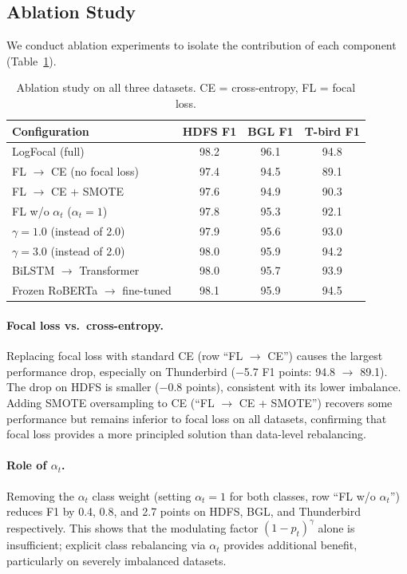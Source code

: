 \documentclass[conference]{IEEEtran}
\begin{document}
\subsection{Ablation Study}\label{sec:ablation}

We conduct ablation experiments to isolate the contribution of each component (Table~\ref{tab:ablation}).

\begin{table}[t]
\centering
\caption{Ablation study on all three datasets. CE = cross-entropy, FL = focal loss.}
\label{tab:ablation}
\small
\setlength{\tabcolsep}{4pt}
\begin{tabular}{lccc}
\toprule
\textbf{Configuration} & \textbf{HDFS F1} & \textbf{BGL F1} & \textbf{T-bird F1} \\
\midrule
LogFocal (full) & 98.2 & 96.1 & 94.8 \\
\midrule
FL $\to$ CE (no focal loss) & 97.4 & 94.5 & 89.1 \\
FL $\to$ CE + SMOTE & 97.6 & 94.9 & 90.3 \\
FL w/o $\alpha_t$ ($\alpha_t = 1$) & 97.8 & 95.3 & 92.1 \\
$\gamma = 1.0$ (instead of 2.0) & 97.9 & 95.6 & 93.0 \\
$\gamma = 3.0$ (instead of 2.0) & 98.0 & 95.9 & 94.2 \\
BiLSTM $\to$ Transformer & 98.0 & 95.7 & 93.9 \\
Frozen RoBERTa $\to$ fine-tuned & 98.1 & 95.9 & 94.5 \\
\bottomrule
\end{tabular}
\end{table}

\paragraph{Focal loss vs.\ cross-entropy.}
Replacing focal loss with standard CE (row ``FL $\to$ CE'')
causes the largest performance drop,
especially on Thunderbird ($-$5.7 F1 points: 94.8 $\to$ 89.1).
The drop on HDFS is smaller ($-$0.8 points), consistent with its lower imbalance.
Adding SMOTE oversampling to CE (``FL $\to$ CE + SMOTE'') recovers some performance
but remains inferior to focal loss on all datasets,
confirming that focal loss provides a more principled solution than data-level rebalancing.

\paragraph{Role of $\alpha_t$.}
Removing the $\alpha_t$ class weight (setting $\alpha_t = 1$ for both classes, row ``FL w/o $\alpha_t$'')
reduces F1 by 0.4, 0.8, and 2.7 points on HDFS, BGL, and Thunderbird respectively.
This shows that the modulating factor $(1-p_t)^\gamma$ alone is insufficient;
explicit class rebalancing via $\alpha_t$ provides additional benefit,
particularly on severely imbalanced datasets.
\end{document}
